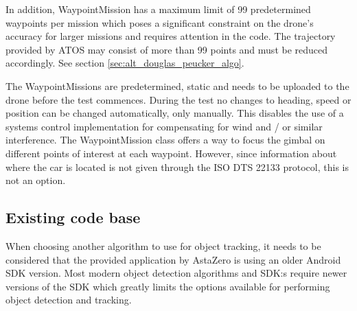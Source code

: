 In addition, WaypointMission has a maximum limit of 99 predetermined waypoints per mission which poses a significant constraint on the drone's accuracy for larger missions and requires attention in the code. The trajectory provided by ATOS may consist of more than 99 points and must be reduced accordingly. See section \ref{sec:alt_douglas_peucker_algo}. 
\newline

The WaypointMissions are predetermined, static and needs to be uploaded to the drone before the test commences. During the test no changes to heading, speed or position can be changed automatically, only manually. This disables the use of a systems control implementation for compensating for wind and / or similar interference. The WaypointMission class offers a way to focus the gimbal on different points of interest at each waypoint. However, since information about where the car is located is not given through the ISO DTS 22133 protocol, this is not an option.


\subsection{Existing code base}
When choosing another algorithm to use for object tracking, it needs to be considered that the provided application by AstaZero is using an older Android SDK version. Most modern object detection algorithms and SDK:s require newer versions of the SDK which greatly limits the options available for performing object detection and tracking.



